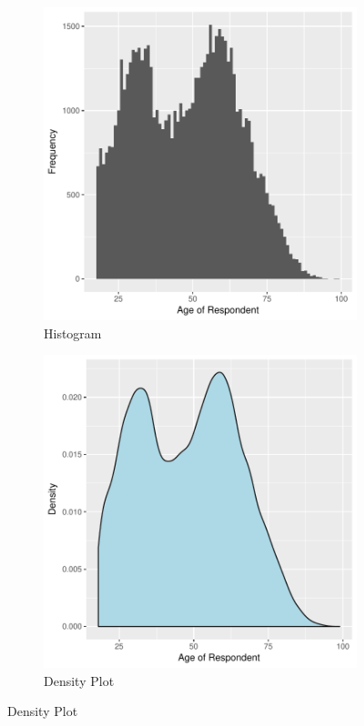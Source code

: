 \documentclass[12pt, letterpaper,notitlepage]{article}
\begin{document}
\begin{figure}[!ht]
\caption{Plotting Variable Distributions}
\centering
\begin{subfigure}{.5\textwidth}
  \centering
  \includegraphics[width=.9\linewidth]{age_histogram.pdf}
  \caption{Histogram}
  \label{fig:sub1}
\end{subfigure}%
\begin{subfigure}{.5\textwidth}
  \centering
  \includegraphics[width=.9\linewidth]{age_density.pdf}
  \caption{Density Plot}
  \label{fig:sub2}
\end{subfigure}
\label{fig:test}
\end{figure}
\end{document}
